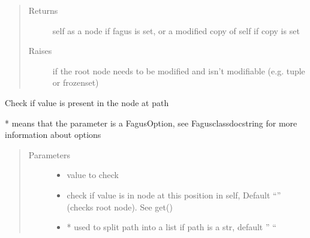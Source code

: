 \documentclass[a4paper,10pt,english]{sphinxmanual}
\begin{document}
\begin{fulllineitems}
\begin{fulllineitems}
\begin{quote}
\begin{description}
\item[{Returns}] \leavevmode
\sphinxAtStartPar
self as a node if fagus is set, or a modified copy of self if copy is set

\item[{Raises}] \leavevmode
\sphinxAtStartPar
{} \textendash{} if the root node needs to be modified and isn’t modifiable (e.g. tuple or frozenset)

\end{description}\end{quote}

\end{fulllineitems}


\begin{fulllineitems}
\label{\detokenize{fagus.fagus:fagus.fagus.Fagus.contains}}
\pysigstartsignatures
{}
\pysigstopsignatures
\sphinxAtStartPar
Check if value is present in the node at path

\sphinxAtStartPar
* means that the parameter is a FagusOption, see Fagus\sphinxhyphen{}class\sphinxhyphen{}docstring for more information about options
\begin{quote}\begin{description}
\item[{Parameters}] \leavevmode\begin{itemize}
\item {}
\sphinxAtStartPar
{} \textendash{} value to check

\item {}
\sphinxAtStartPar
{} \textendash{} check if value is in node at this position in self, Default “” (checks root node). See get()

\item {}
\sphinxAtStartPar
{} \textendash{} * used to split path into a list if path is a str, default ” “


\end{itemize}
\end{description}
\end{quote}
\end{fulllineitems}
\end{fulllineitems}
\end{document}

